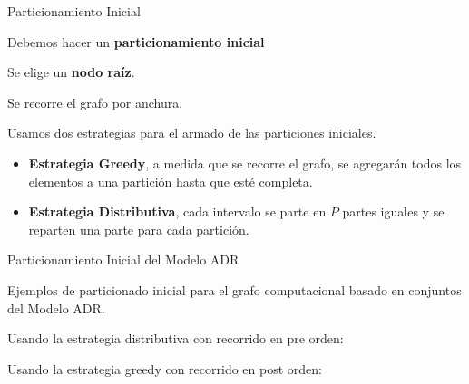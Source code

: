 \begin{frame}{Particionamiento Inicial}

Debemos hacer un \textbf{particionamiento inicial}

Se elige un \textbf{nodo raíz}.

Se recorre el grafo por anchura.

Usamos dos estrategias para el armado de las particiones iniciales.

\begin{itemize}
    \item \textbf{Estrategia Greedy}, a medida que se recorre el grafo, se 
    agregarán todos los elementos a una partición hasta que esté 
    completa.

    \item \textbf{Estrategia Distributiva}, cada intervalo se parte en $P$
    partes iguales y se reparten una parte para cada partición.
\end{itemize}

\end{frame}


\begin{frame}[fragile]{Particionamiento Inicial del Modelo ADR}

Ejemplos de particionado inicial para el grafo computacional basado en conjuntos del Modelo
ADR.

\vspace{1em}

Usando la estrategia distributiva con recorrido en pre orden:

\begin{center}
  \scriptsize
\end{center}

\vspace{1em}

Usando la estrategia greedy con recorrido en post orden:

\scriptsize

\begin{center}
\end{center}

\end{frame}


